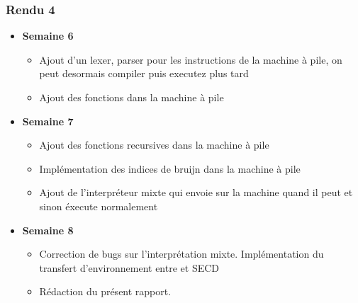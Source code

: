\subsubsection*{Rendu 4}
\begin{itemize}
  \item \textbf{Semaine 6 }
    \begin{itemize}
      \item Ajout d'un lexer, parser pour les instructions de la machine à pile, on peut desormais compiler puis executez plus tard
      \item Ajout des fonctions dans la machine à pile
    \end{itemize}
    
   \item \textbf{Semaine 7 }
    \begin{itemize}
   \item Ajout des fonctions recursives dans la machine à pile
   \item Implémentation des indices de bruijn dans la machine à pile
   \item Ajout de l'interpréteur mixte qui envoie sur la machine quand il peut et sinon éxecute normalement
    \end{itemize} 
    
    \item \textbf{Semaine 8} 
    \begin{itemize}
    \item Correction de bugs sur l'interprétation mixte. Implémentation du transfert d'environnement entre \fouine et SECD
    \item Rédaction du présent rapport.
   \end{itemize}
\end{itemize}